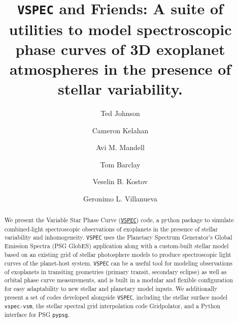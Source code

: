 \documentclass[twocolumn]{aastex631}
\newcommand{\vspec}[1]{\texttt{VSPEC}#1}
\begin{document}
\title{\vspec{} and Friends: A suite of utilities to model spectroscopic phase curves of 3D exoplanet atmospheres in the presence of stellar variability.}

\author{Ted Johnson}

\author{Cameron Kelahan}

\author{Avi M. Mandell}

\author{Tom Barclay}

\author{Veselin B. Kostov}

\author{Geronimo L. Villanueva}

\begin{abstract}
    We present the Variable Star Phase Curve (\href{https://github.com/VSPEC-collab/VSPEC} \vspec{}) code,
    a python package to simulate combined-light spectroscopic observations of exoplanets in the presence of stellar variability and inhomogeneity.
    \vspec{} uses the Planetary Spectrum Generator's Global Emission Spectra (PSG GlobES) application along with a custom-built
    stellar model based on an existing grid of stellar photosphere models to produce spectroscopic light curves of the planet-host system.
    \vspec{} can be a useful tool for modeling observations of exoplanets in transiting geometries (primary transit, secondary eclipse) as well as orbital phase curve measurements,
    and is built in a modular and flexible configuration for easy adaptability to new stellar and planetary model inputs. We additionally present
    a set of codes developed alongside \vspec{}, including the stellar surface model \texttt{vspec-vsm}, the stellar spectral grid interpolation code
    Gridpolator, and a Python interface for PSG \texttt{pypsg}.
\end{abstract}
\end{document}
